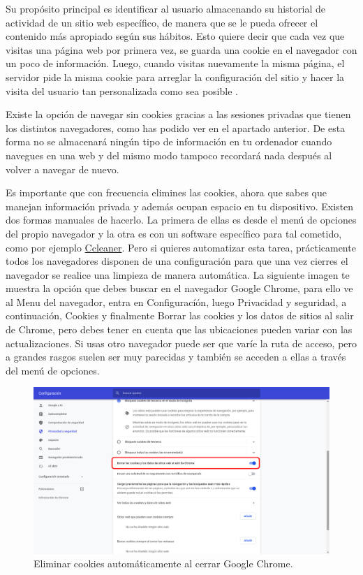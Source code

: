 \documentclass[
  a4paper,
  openany]{book}
\begin{document}
Su propósito principal es identificar al usuario almacenando su historial de actividad de un sitio web específico, de manera que se le pueda ofrecer el contenido más apropiado según sus hábitos. Esto quiere decir que cada vez que visitas una página web por primera vez, se guarda una cookie en el navegador con un poco de información. Luego, cuando visitas nuevamente la misma página, el servidor pide la misma cookie para arreglar la configuración del sitio y hacer la visita del usuario tan personalizada como sea posible \citep{cookies-navegador}.

Existe la opción de navegar sin cookies gracias a las sesiones privadas que tienen los distintos navegadores, como has podido ver en el apartado anterior. De esta forma no se almacenará ningún tipo de información en tu ordenador cuando navegues en una web y del mismo modo tampoco recordará nada después al volver a navegar de nuevo.

Es importante que con frecuencia elimines las cookies, ahora que sabes que manejan información privada y además ocupan espacio en tu dispositivo. Existen dos formas manuales de hacerlo. La primera de ellas es desde el menú de opciones del propio navegador y la otra es con un software específico para tal cometido, como por ejemplo \href{https://www.ccleaner.com/es-es}{Ccleaner}. Pero si quieres automatizar esta tarea, prácticamente todos los navegadores disponen de una configuración para que una vez cierres el navegador se realice una limpieza de manera automática. La siguiente imagen te muestra la opción que debes buscar en el navegador Google Chrome, para ello ve al Menu del navegador, entra en Configuracíón, luego Privacidad y seguridad, a continuación, Cookies y finalmente Borrar las cookies y los datos de sitios al salir de Chrome, pero debes tener en cuenta que las ubicaciones pueden variar con las actualizaciones. Si usas otro navegador puede ser que varíe la ruta de acceso, pero a grandes rasgos suelen ser muy parecidas y también se acceden a ellas a través del menú de opciones.

\begin{figure}

{\centering \includegraphics[width=0.75\linewidth]{images/borrado-cookies-cierre-navegador} 

}

\caption{Eliminar cookies automáticamente al cerrar Google Chrome.}\label{fig:unnamed-chunk-5}
\end{figure}
\end{document}
